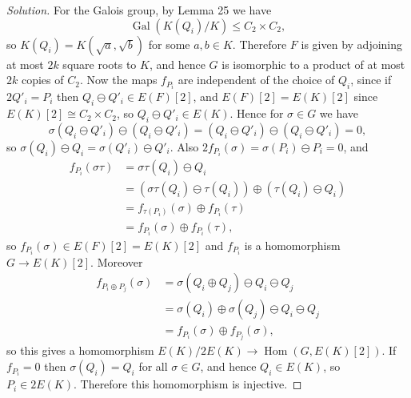 \documentclass[a4paper]{article}
\theoremstyle{plain}
\theoremstyle{remark}
\theoremstyle{definition}
\DeclareMathOperator{\Hom}{Hom}
\DeclareMathOperator{\Gal}{Gal}
\begin{document}
\begin{enumerate}
        \begin{proof}[Solution]
            For the Galois group, by Lemma 25 we have
            \begin{equation*}
                \Gal(K(Q_i)/K)\le C_2\times C_2,
            \end{equation*}
            so $K(Q_i)=K(\sqrt a,\sqrt b)$ for some $a,b\in K$. Therefore $F$ is
            given by adjoining at most $2k$ square roots to $K$, and hence $G$
            is isomorphic to a product of at most $2k$ copies of $C_2$. Now the
            maps $f_{P_i}$ are independent of the choice of $Q_i$, since if
            $2Q'_i=P_i$ then $Q_i\ominus Q'_i\in E(F)[2]$, and $E(F)[2]=E(K)[2]$
            since $E(K)[2]\cong C_2\times C_2$, so $Q_i\ominus Q'_i\in E(K)$.
            Hence for $\sigma\in G$ we have
            \begin{equation*}
                \sigma(Q_i\ominus Q'_i)\ominus(Q_i\ominus Q'_i)
                    = (Q_i\ominus Q'_i)\ominus(Q_i\ominus Q'_i)
                    = 0,
            \end{equation*}
            so $\sigma(Q_i)\ominus Q_i=\sigma(Q'_i)\ominus Q'_i$. Also
            $2f_{P_i}(\sigma)=\sigma(P_i)\ominus P_i=0$, and
            \begin{align*}
                f_{P_i}(\sigma\tau)
                    &= \sigma\tau(Q_i)\ominus Q_i \\
                    &= (\sigma\tau(Q_i)\ominus\tau(Q_i))
                        \oplus (\tau(Q_i)\ominus Q_i) \\
                    &= f_{\tau(P_i)}(\sigma) \oplus f_{P_i}(\tau) \\
                    &= f_{P_i}(\sigma) \oplus f_{P_i}(\tau),
            \end{align*}
            so $f_{P_i}(\sigma)\in E(F)[2]=E(K)[2]$ and $f_{P_i}$ is a
            homomorphism $G\to E(K)[2]$. Moreover
            \begin{align*}
                f_{P_i\oplus P_j}(\sigma)
                    &= \sigma(Q_i\oplus Q_j)\ominus Q_i\ominus Q_j \\
                    &= \sigma(Q_i)\oplus\sigma(Q_j)\ominus Q_i\ominus Q_j \\
                    &= f_{P_i}(\sigma)\oplus f_{P_j}(\sigma),
            \end{align*}
            so this gives a homomorphism $E(K)/2E(K)\to\Hom(G,E(K)[2])$. If
            $f_{P_i}=0$ then $\sigma(Q_i)=Q_i$ for all $\sigma\in G$, and hence
            $Q_i\in E(K)$, so $P_i\in 2E(K)$. Therefore this homomorphism is
            injective.


\end{proof}
\end{enumerate}
\end{document}
